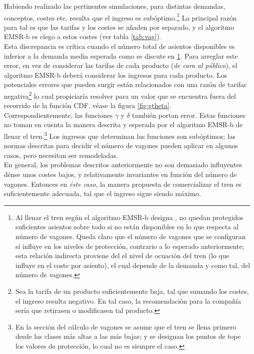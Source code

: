 \documentclass[12pt]{article}
\begin{document}
Habiendo realizado las pertinentes simulaciones, para distintas demandas, conceptos, costes etc. resulta que el ingreso es subóptimo.\footnote{Al llenar el tren según el algoritmo EMSR-b designa \cite{wiki:emsr}, no quedan protegidos suficientes asientos sobre todo si no están disponibles en lo que respecta al número de vagones. Queda claro que el número de vagones que se configuran sí influye en los niveles de protección, contrario a lo esperado anteriormente; esta relación indirecta proviene del el nivel de ocuación del tren (lo que influye en el coste por asiento), el cual depende de la demanda y como tal, del número de vagones.\label{fot:np}} La principal razón para tal es que las tarifas y los costes se añaden por separado, y el algoritmo EMSR-b es ciego a estos costes (ver tabla \ref{tab:vag}).\\

Esta discrepancia es crítica cuando el número total de asientos disponibles es inferior a la demanda media esperada como se discute en \ref{fot:np}. Para arreglar este error, en vez de considerar las tarifas de cada producto (\emph{de cara al público}), el algoritmo EMSR-b deberá considerar los ingresos para cada producto. Los potenciales errores que pueden surgir están relacionados con una razón de tarifas negativa\footnote{Sea la tarifa de un producto suficientemente baja, tal que sumando los costes, el ingreso resulta negativo. En tal caso, la recomendación para la compañía sería que retirasen o modificasen tal producto.} lo cual propiciaría resolver para un valor que se encuentra fuera del recorrido de la función CDF, véase la figura \ref{fig:gtheta}.\\

Correspondientemente, las funciones $\gamma$ y $\delta$ también portan error. Estas funciones no toman en cuenta la manera descrita y esperada por el algoritmo EMSR-b de llenar el tren.\footnote{En la sección del cálculo de vagones se asume que el tren se llena primero desde las clases más altas a las más bajas; y se designan los puntos de tope los valores de protección, lo cual no es siempre el caso.} Los ingresos que determinan las funciones son subóptimos; las normas descritas para decidir el número de vagones pueden aplicar en algunos casos, pero necesitan ser remodeladas.\\

En general, los problemas descritos anteriormente no son demasiado influyentes dénse unos costes bajos, y relativamente invariantes en función del número de vagones. Entonces en \emph{éste caso}, la manera propuesta de comercializar el tren es suficientemente adecuada, tal que el ingreso sigue siendo máximo.
\end{document}
